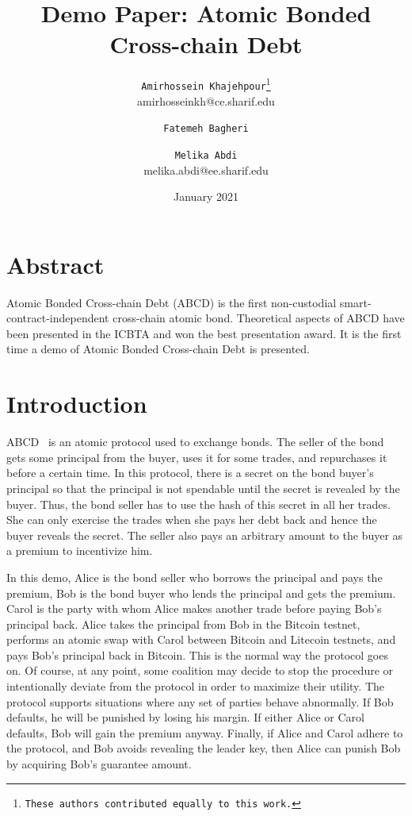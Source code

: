 \documentclass{article}
\title{Demo Paper: Atomic Bonded Cross-chain Debt}
\author{
  \texttt{Amirhossein Khajehpour\thanks{These authors contributed equally to this work.}}\\
  amirhosseinkh@ce.sharif.edu
  \and
  \texttt{Fatemeh Bagheri\samethanks}%
  \and
  \texttt{Melika Abdi}\\
  melika.abdi@ee.sharif.edu
}
\date{January 2021}
\begin{document}
\maketitle
\section{Abstract}
Atomic Bonded Cross-chain Debt (ABCD) is the first non-custodial smart-contract-independent cross-chain atomic bond. Theoretical aspects of ABCD have been presented in the ICBTA and won the best presentation award. It is the first time a demo of Atomic Bonded Cross-chain Debt is presented. 

\section{Introduction}
ABCD~\cite{tefagh2020atomic} is an atomic protocol used to exchange bonds. The seller of the bond gets some principal from the buyer, uses it for some trades, and repurchases it before a certain time. In this protocol, there is a secret on the bond buyer's principal so that the principal is not spendable until the secret is revealed by the buyer. Thus, the bond seller has to use the hash of this secret in all her trades. She can only exercise the trades when she pays her debt back and hence the buyer reveals the secret. The seller also pays an arbitrary amount to the buyer as a premium to incentivize him.

In this demo, Alice is the bond seller who borrows the principal and pays the premium, Bob is the bond buyer who lends the principal and gets the premium. Carol is the party with whom Alice makes another trade before paying Bob's principal back. Alice takes the principal from Bob in the Bitcoin testnet, performs an atomic swap with Carol between Bitcoin and Litecoin testnets, and pays Bob's principal back in Bitcoin. This is the normal way the protocol goes on. Of course, at any point, some coalition may decide to stop the procedure or intentionally deviate from the protocol in order to maximize their utility. The protocol supports situations where any set of parties behave abnormally. If Bob defaults, he will be punished by losing his margin. If either Alice or Carol defaults, Bob will gain the premium anyway. Finally, if Alice and Carol adhere to the protocol, and Bob avoids revealing the leader key, then Alice can punish Bob by acquiring Bob's guarantee amount. 
\end{document}
